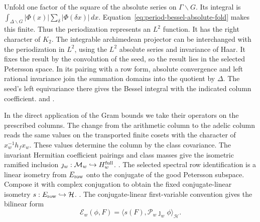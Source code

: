 Unfold one factor of the square of the absolute series on
\(\Gamma\backslash G\). Its integral is
\(\int_{\Delta\backslash G}|\Phi(x)|
              \sum_\delta|\Phi(\delta x)|\,dx\).
Equation~\eqref{eq:period-bessel-absolute-fold} makes this finite.
Thus the periodization represents an \(L^2\) function. It has
the right character of \(K_2\). The integrable archimedean
projector can be interchanged with the periodization in \(L^2\),
using the \(L^2\) absolute series and invariance of Haar. It
fixes the result by the convolution of the seed, so the result
lies in the selected Petersson space. In its pairing with a
row form, absolute convergence and left rational invariance
join the summation domains into the quotient by \(\Delta\).
The seed's left equivariance there gives the Bessel integral
with the indicated column coefficient.
 and
.

In the direct application of the Gram bounds we take their
operators on the prescribed columns. The change from the
arithmetic column to the adelic column reads the same values
on the transported finite cosets with the character of
\(x_w^{-1}h_fx_w\). These values determine the column by the
class covariance. The invariant Hermitian coefficient
pairings and class masses give the isometric ramified
inclusion \(\jmath_w:\mathcal M_w\hookrightarrow H_w^{\rm full}\).
.
The selected spectral row identification is a linear isometry from
\(E_{\rm row}\) onto the conjugate of the good Petersson subspace.
Compose it with complex conjugation to obtain the fixed
conjugate-linear isometry \(s:E_{\rm row}\hookrightarrow\mathcal H\).
.
The conjugate-linear first-variable convention gives the
bilinear form
\[
 \mathcal E_w(\phi,F)
   =\big\langle s(F),\mathcal P_w\jmath_w\phi\big\rangle_{\mathcal H}.
\]

